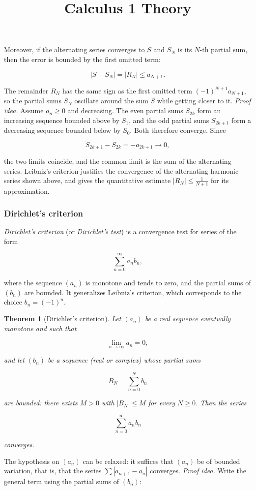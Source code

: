 \documentclass[11pt,a4paper]{article} \usepackage[T1]{fontenc}
\theoremstyle{plain} \newtheorem{theorem}{Theorem} \title{Calculus 1 Theory}
\begin{document}
Moreover, if the alternating series converges to $S$ and $S_N$ is its $N$-th
partial sum, then the error is bounded by the first omitted term:

\[
|S - S_N| = |R_N| \le a_{N+1}.
\]

The remainder $R_N$ has the same sign as the first omitted term $(-1)^{N+1}
a_{N+1}$, so the partial sums $S_N$ oscillate around the sum $S$ while getting
closer to it. \emph{Proof idea.} Assume $a_n\ge 0$ and decreasing. The even
partial sums $S_{2k}$ form an increasing sequence bounded above by $S_1$, and
the odd partial sums $S_{2k+1}$ form a decreasing sequence bounded below by
$S_0$. Both therefore converge. Since

\[
S_{2k+1} - S_{2k} = -a_{2k+1} \to 0,
\]

the two limits coincide, and the common limit is the sum of the alternating
series. Leibniz's criterion justifies the convergence of the alternating
harmonic series shown above, and gives the quantitative estimate $|R_N|\le
\frac{1}{N+1}$ for its approximation.

\subsubsection {Dirichlet's criterion}

\emph{Dirichlet's criterion} (or \emph{Dirichlet's test}) is a convergence test
for series of the form

\[
\sum_{n=0}^{\infty} a_n b_n,
\]

where the sequence $(a_n)$ is monotone and tends to zero, and the partial sums
of $(b_n)$ are bounded. It generalizes Leibniz's criterion, which corresponds
to the choice $b_n = (-1)^n$.

\begin{theorem}
[Dirichlet's criterion] Let $(a_n)$ be a real sequence eventually monotone and
such that

\[
\lim_{n\to\infty} a_n = 0,
\]

and let $(b_n)$ be a sequence (real or complex) whose partial sums

\[
B_N = \sum_{n=0}^{N} b_n
\]

are bounded: there exists $M>0$ with $|B_N|\le M$ for every $N\ge 0$. Then the
series

\[
\sum_{n=0}^{\infty} a_n b_n
\]

converges.
\end{theorem}

The hypothesis on $(a_n)$ can be relaxed: it suffices that $(a_n)$ be of
bounded variation, that is, that the series $\sum |a_{n+1}-a_n|$ converges.
\emph{Proof idea.} Write the general term using the partial sums of $(b_n)$:
\end{document}
